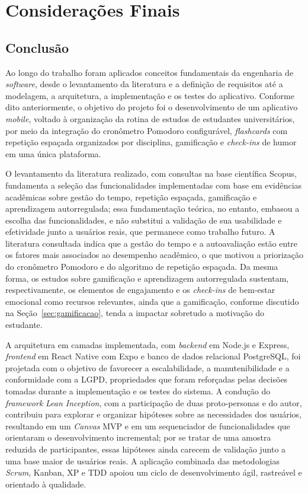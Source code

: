\chapter{Considerações Finais}

\section{Conclusão}

Ao longo do trabalho foram aplicados conceitos fundamentais da engenharia de \textit{software}, desde o levantamento da literatura e a definição de requisitos até a modelagem, a arquitetura, a implementação e os testes do aplicativo.
Conforme dito anteriormente, o objetivo do projeto foi o desenvolvimento de um aplicativo \textit{mobile}, voltado à organização da rotina de estudos de estudantes universitários, por meio da integração do cronômetro Pomodoro configurável, \textit{flashcards} com repetição espaçada organizados por disciplina, gamificação e \textit{check-ins} de humor em uma única plataforma.

O levantamento da literatura realizado, com consultas na base científica Scopus, fundamenta a seleção das funcionalidades implementadas com base em evidências acadêmicas sobre gestão do tempo, repetição espaçada, gamificação e aprendizagem autorregulada; essa fundamentação teórica, no entanto, embasou a escolha das funcionalidades, e não substitui a validação de sua usabilidade e efetividade junto a usuários reais, que permanece como trabalho futuro.
A literatura consultada indica que a gestão do tempo e a autoavaliação estão entre os fatores mais associados ao desempenho acadêmico, o que motivou a priorização do cronômetro Pomodoro e do algoritmo de repetição espaçada.
Da mesma forma, os estudos sobre gamificação e aprendizagem autorregulada sustentam, respectivamente, os elementos de engajamento e os \textit{check-ins} de bem-estar emocional como recursos relevantes, ainda que a gamificação, conforme discutido na Seção~\ref{sec:gamificacao}, tenda a impactar sobretudo a motivação do estudante.

A arquitetura em camadas implementada, com \textit{backend} em Node.js e Express, \textit{frontend} em React Native com Expo e banco de dados relacional PostgreSQL, foi projetada com o objetivo de favorecer a escalabilidade, a manutenibilidade e a conformidade com a LGPD, propriedades que foram reforçadas pelas decisões tomadas durante a implementação e os testes do sistema.
A condução do \textit{framework} \textit{Lean Inception}, com a participação de duas proto-personas e do autor, contribuiu para explorar e organizar hipóteses sobre as necessidades dos usuários, resultando em um \textit{Canvas} MVP e em um sequenciador de funcionalidades que orientaram o desenvolvimento incremental; por se tratar de uma amostra reduzida de participantes, essas hipóteses ainda carecem de validação junto a uma base maior de usuários reais.
A aplicação combinada das metodologias \textit{Scrum}, Kanban, XP e TDD apoiou um ciclo de desenvolvimento ágil, rastreável e orientado à qualidade.

